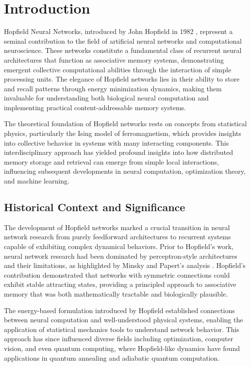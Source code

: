 \documentclass[11pt,a4paper]{article}
\begin{document}
\section{Introduction}

Hopfield Neural Networks, introduced by John Hopfield in 1982 \cite{hopfield1982}, represent a seminal contribution to the field of artificial neural networks and computational neuroscience. These networks constitute a fundamental class of recurrent neural architectures that function as associative memory systems, demonstrating emergent collective computational abilities through the interaction of simple processing units. The elegance of Hopfield networks lies in their ability to store and recall patterns through energy minimization dynamics, making them invaluable for understanding both biological neural computation and implementing practical content-addressable memory systems.

The theoretical foundation of Hopfield networks rests on concepts from statistical physics, particularly the Ising model of ferromagnetism, which provides insights into collective behavior in systems with many interacting components. This interdisciplinary approach has yielded profound insights into how distributed memory storage and retrieval can emerge from simple local interactions, influencing subsequent developments in neural computation, optimization theory, and machine learning.

\subsection{Historical Context and Significance}

The development of Hopfield networks marked a crucial transition in neural network research from purely feedforward architectures to recurrent systems capable of exhibiting complex dynamical behaviors. Prior to Hopfield's work, neural network research had been dominated by perceptron-style architectures and their limitations, as highlighted by Minsky and Papert's analysis \cite{minsky1969}. Hopfield's contribution demonstrated that networks with symmetric connections could exhibit stable attracting states, providing a principled approach to associative memory that was both mathematically tractable and biologically plausible.

The energy-based formulation introduced by Hopfield established connections between neural computation and well-understood physical systems, enabling the application of statistical mechanics tools to understand network behavior. This approach has since influenced diverse fields including optimization, computer vision, and even quantum computing, where Hopfield-like dynamics have found applications in quantum annealing and adiabatic quantum computation.
\end{document}
